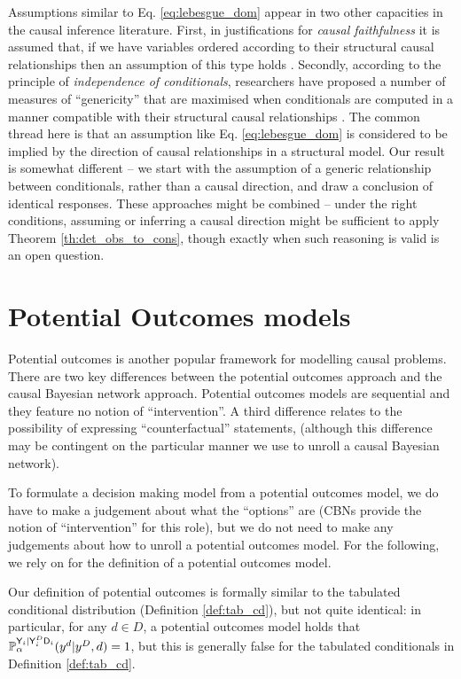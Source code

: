 Assumptions similar to Eq. \eqref{eq:lebesgue_dom} appear in two other capacities in the causal inference literature. First, in justifications for \emph{causal faithfulness} it is assumed that, if we have variables ordered according to their structural causal relationships then an assumption of this type holds \citet{meek_strong_1995}. Secondly, according to the principle of \emph{independence of conditionals}, researchers have proposed a number of measures of ``genericity'' that are maximised when conditionals are computed in a manner compatible with their structural causal relationships \citep{lemeire_replacing_2013}. The common thread here is that an assumption like Eq. \eqref{eq:lebesgue_dom} is considered to be implied by the direction of causal relationships in a structural model. Our result is somewhat different -- we start with the assumption of a generic relationship between conditionals, rather than a causal direction, and draw a conclusion of identical responses. These approaches might be combined -- under the right conditions, assuming or inferring a causal direction might be sufficient to apply Theorem \ref{th:det_obs_to_cons}, though exactly when such reasoning is valid is an open question.

\section{Potential Outcomes models}\label{sec:potential_outcomes}

Potential outcomes is another popular framework for modelling causal problems. There are two key differences between the potential outcomes approach and the causal Bayesian network approach. Potential outcomes models are sequential and they feature no notion of ``intervention''. A third difference relates to the possibility of expressing ``counterfactual'' statements, (although this difference may be contingent on the particular manner we use to unroll a causal Bayesian network).

To formulate a decision making model from a potential outcomes model, we do have to make a judgement about what the ``options'' are (CBNs provide the notion of ``intervention'' for this role), but we do not need to make any judgements about how to unroll a potential outcomes model. For the following, we rely on \citet{rubin_causal_2005} for the definition of a potential outcomes model.

Our definition of potential outcomes is formally similar to the tabulated conditional distribution (Definition \ref{def:tab_cd}), but not quite identical: in particular, for any $d\in D$, a potential outcomes model holds that $\mathbb{P}_\alpha^{\mathsf{Y}_i|\mathsf{Y}^D_i\mathsf{D}_i}(y^d|y^D,d)=1$, but this is generally false for the tabulated conditionals in Definition \ref{def:tab_cd}.


